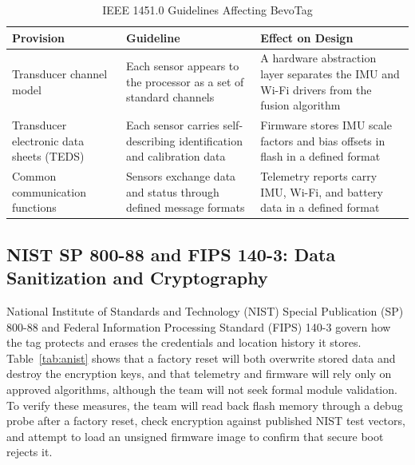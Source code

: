 \documentclass[12pt,letterpaper]{article}
\newenvironment{spectable}{\setstretch{1.0}\renewcommand{\arraystretch}{1.1}}{}
\begin{document}
\begin{table}[H]
\caption{IEEE 1451.0 Guidelines Affecting BevoTag}
\label{tab:a1451}
\centering
\begin{spectable}
\begin{tabularx}{\linewidth}{@{}L{1.7in} Y Y@{}}
\toprule
\textbf{Provision} & \textbf{Guideline} & \textbf{Effect on Design} \\
\midrule
Transducer channel model & Each sensor appears to the processor as a set of standard channels & A hardware abstraction layer separates the IMU and Wi-Fi drivers from the fusion algorithm \\
Transducer electronic data sheets (TEDS) & Each sensor carries self-describing identification and calibration data & Firmware stores IMU scale factors and bias offsets in flash in a defined format \\
Common communication functions & Sensors exchange data and status through defined message formats & Telemetry reports carry IMU, Wi-Fi, and battery data in a defined format \\
\bottomrule
\end{tabularx}
\end{spectable}
\end{table}

\subsection*{NIST SP 800-88 and FIPS 140-3: Data Sanitization and Cryptography}
National Institute of Standards and Technology (NIST) Special Publication (SP) 800-88
\cite{nist80088} and Federal Information Processing Standard (FIPS) 140-3 \cite{fips1403} govern how
the tag protects and erases the credentials and location history it stores. Table~\ref{tab:anist}
shows that a factory reset will both overwrite stored data and destroy the encryption keys, and that
telemetry and firmware will rely only on approved algorithms, although the team will not seek formal
module validation. To verify these measures, the team will read back flash memory through a debug
probe after a factory reset, check encryption against published NIST test vectors, and attempt to
load an unsigned firmware image to confirm that secure boot rejects it.
\end{document}
